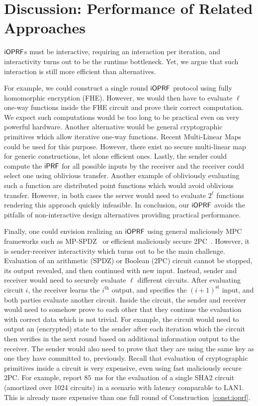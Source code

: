 \section{Discussion: Performance of Related Approaches}
\label{sec:perf-related}
$\mathsf{i}\mathsf{OPRF}$s must be interactive, requiring an interaction per
iteration, and interactivity turns out to be the runtime bottleneck.
Yet, we argue that such interaction is still more efficient than
alternatives.

For example, we could construct a single round $\mathsf{i}\mathsf{OPRF}$ protocol using
fully homomorphic encryption (FHE).  However, we would then have to
evaluate $\ell$ one-way functions inside the FHE circuit and prove
their correct computation.  We expect such computations would be too
long to be practical even on very powerful hardware.  Another
alternative would be general cryptographic primitives which allow
iterative one-way functions.  Recent Multi-Linear Maps could be used
for this purpose.  However, there exist no secure multi-linear map for
generic constructions, let alone efficient ones.  Lastly, the sender
could compute the $\mathsf{i}\mathsf{PRF}$ for all possible inputs by the receiver and
the receiver could select one using oblivious transfer.  Another
example of obliviously evaluating such a function are distributed
point functions \cite{fss} which would avoid oblivious transfer.
However, in both cases the server would need to evaluate $2^\ell$
functions rendering this approach quickly infeasible.  In conclusion,
our $\mathsf{i}\mathsf{OPRF}$ avoids the pitfalls of non-interactive design
alternatives providing practical performance.


Finally, one could envision realizing an $\mathsf{i}\mathsf{OPRF}$ using general
maliciously MPC frameworks such as MP-SPDZ~\cite{mpspdz} or
efficient maliciously secure 2PC~\cite{empag2pc}. However, it
is sender-receiver interactivity which turns out to be the main
challenge. Evaluation of an arithmetic (SPDZ) or Boolean (2PC) circuit
cannot be stopped, its output revealed, and then continued with new
input. Instead, sender and receiver would need to securely evaluate
$\ell$ different circuits. After evaluating circuit $i$, the receiver
learns the $i^{\text{th}}$ output, and specifies the $(i+1)^\text{st}$
input, and both parties evaluate another circuit. Inside the circuit,
the sender and receiver would need to somehow prove to each other that
they continue the evaluation with correct data which is not
trivial. For example, the circuit would need to output an (encrypted)
state to the sender after each iteration which the circuit then
verifies in the next round based on additional information output to
the receiver. The sender would also need to prove that they are using
the same key as one they have committed to, previously. Recall that
evaluation of cryptographic primitives inside a circuit is very
expensive, even using fast maliciously secure 2PC. For example,
\citet{empag2pc} report $85$~ms for the evaluation of a single SHA2
circuit (amortized over 1024 circuits) in a scenario with latency
comparable to LAN1. This is already more expensive than one full round
of Construction~\ref{const:ioprf}.

